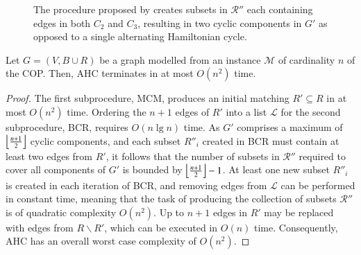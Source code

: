\documentclass[authoryear]{elsarticle}
\begin{document}
\begin{figure}[H]
	\centering	
	\begin{subfigure}[h]{0.35\textwidth}
		
		\caption{}
		\label{fig:bcrerror}
	\end{subfigure} \hspace{5mm}
	\begin{subfigure}[h]{0.25\textwidth}
		
		\caption{}
		\label{fig:mpsconnecterror}
	\end{subfigure} \hspace{5mm}
	\begin{subfigure}[h]{0.25\textwidth}
		
		\caption{}
		\label{fig:mpscycleerror}
	\end{subfigure}
	\caption{The procedure proposed by \citet{becker2010} creates subsets in $\mathcal{R}''$ each containing edges in both $C_2$ and $C_3$, resulting in two cyclic components in $G'$ as opposed to a single alternating Hamiltonian cycle.}	
	\label{fig:overlaperror}
\end{figure}

\begin{theorem}
	\label{thm:ahc}
	Let $G=(V, B \cup R)$ be a graph modelled from an instance $\mathcal{M}$ of cardinality $n$ of the COP. Then, AHC terminates in at most $O(n^2)$ time.
\end{theorem}

\begin{proof}
	The first subprocedure, MCM, produces an initial matching $R' \subseteq R$ in at most $O(n^2)$ time. Ordering the $n+1$ edges of $R'$ into a list $\mathcal{L}$ for the second subprocedure, BCR, requires $O(n\lg n)$ time. As $G'$ comprises a maximum of $\floor*{\frac{n+1}{2}}$ cyclic components, and each subset $R''_i$ created in BCR must contain at least two edges from $R'$, it follows that the number of subsets in $\mathcal{R}''$ required to cover all components of $G'$ is bounded by $\floor*{\frac{n+1}{2}}-1$. At least one new subset $R''_i$ is created in each iteration of BCR, and removing edges from $\mathcal{L}$ can be performed in constant time, meaning that the task of producing the collection of subsets $\mathcal{R}''$ is of quadratic complexity $O(n^2)$. Up to $n+1$ edges in $R'$ may be replaced with edges from $R \backslash R'$, which can be executed in $O(n)$ time. Consequently, AHC has an overall worst case complexity of $O(n^2)$.
\end{proof}	
\end{document}
